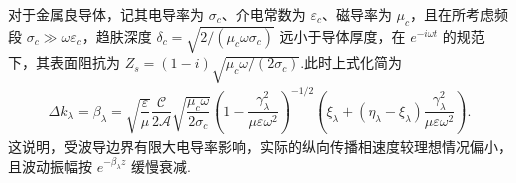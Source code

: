 \begin{exbox}
	对于金属良导体，记其电导率为 \(\sigma_c\)、介电常数为 \(\varepsilon_c\)、磁导率为 \(\mu_c\)，且在所考虑频段 \(\sigma_c \gg \omega\varepsilon_c\)，趋肤深度 \(\delta_c = \sqrt{2/(\mu_c \omega\sigma_c)}\) 远小于导体厚度，在 \(e^{-i\omega t}\) 的规范下，其表面阻抗为 \(Z_s = (1 - i) \sqrt{\mu_c \omega/(2\sigma_c)}\).此时上式化简为
	\begin{align*}
		\Delta k_{\lambda} = \beta_{\lambda} = \sqrt{\dfrac{\varepsilon}{\mu}} \dfrac{\mathcal{C}}{2 \mathcal{A}} \sqrt{\dfrac{\mu_c \omega}{2\sigma_c}} \left( 1 - \dfrac{\gamma_{\lambda}^2}{\mu\varepsilon\omega^2} \right)^{-1/2} \left( \xi_{\lambda} + (\eta_{\lambda} - \xi_{\lambda}) \dfrac{\gamma_{\lambda}^2}{\mu\varepsilon\omega^2} \right).
	\end{align*}
	这说明，受波导边界有限大电导率影响，实际的纵向传播相速度较理想情况偏小，且波动振幅按 \(e^{-\beta_{\lambda} z}\) 缓慢衰减.
\end{exbox}

